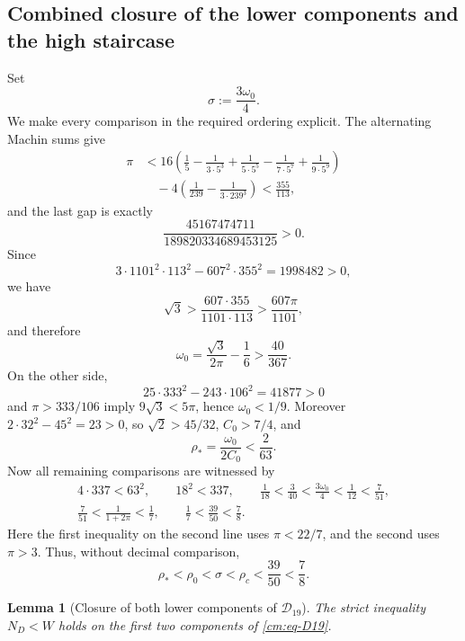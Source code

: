 \documentclass[11pt]{article}
\numberwithin{equation}{section}
\newtheorem{lemma}[theorem]{Lemma}
\theoremstyle{definition}
\theoremstyle{remark}
\begin{document}
\subsection{Combined closure of the lower components and the high staircase}

Set
\[
 \sigma:=\frac{3\omega_0}{4}.
\]
We make every comparison in the required ordering explicit.  The
alternating Machin sums give
\[
\begin{aligned}
 \pi
 &<16\left(\frac15-\frac1{3\cdot5^3}
 +\frac1{5\cdot5^5}-\frac1{7\cdot5^7}
 +\frac1{9\cdot5^9}\right)\\
 &\quad-4\left(\frac1{239}-\frac1{3\cdot239^3}\right)
 <\frac{355}{113},
\end{aligned}
\]
and the last gap is exactly
\[
 \frac{45167474711}{189820334689453125}>0.
\]
Since
\[
 3\cdot1101^2\cdot113^2-607^2\cdot355^2=1998482>0,
\]
we have
\[
 \sqrt3>\frac{607\cdot355}{1101\cdot113}
 >\frac{607\pi}{1101},
\]
and therefore
\begin{equation}
 \omega_0=\frac{\sqrt3}{2\pi}-\frac16>\frac{40}{367}.
 \label{cm:eq-omega-lower}
\end{equation}
On the other side,
\[
 25\cdot333^2-243\cdot106^2=41877>0
\]
and \(\pi>333/106\) imply \(9\sqrt3<5\pi\), hence
\(\omega_0<1/9\).  Moreover
\(2\cdot32^2-45^2=23>0\), so
\(\sqrt2>45/32\), \(C_0>7/4\), and
\[
 \rho_*=\frac{\omega_0}{2C_0}<\frac2{63}.
\]
Now all remaining comparisons are witnessed by
\[
\begin{gathered}
 4\cdot337<63^2,\qquad 18^2<337,\qquad
 \frac1{18}<\frac3{40}<\frac{3\omega_0}{4}
 <\frac1{12}<\frac7{51},\\
 \frac7{51}<\frac1{1+2\pi}<\frac17,\qquad
 \frac17<\frac{39}{50}<\frac78.
\end{gathered}
\]
Here the first inequality on the second line uses \(\pi<22/7\), and the
second uses \(\pi>3\).  Thus, without decimal comparison,
\[
 \rho_*<\rho_0<\sigma<\rho_c<\frac{39}{50}<\frac78.
\]

\begin{lemma}[Closure of both lower components of \(\mathcal D_{19}\)]
\label{cm:lem-lower-closure}
The strict inequality \(N_D<W\) holds on the first two components of
\eqref{cm:eq-D19}.
\end{lemma}
\end{document}
